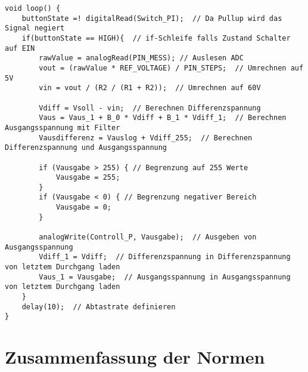 \begin{appendix}
\begin{lstlisting}[basicstyle=\tiny,style=myArduino]
void loop() {
	buttonState =! digitalRead(Switch_PI);  // Da Pullup wird das Signal negiert
	if(buttonState == HIGH){  // if-Schleife falls Zustand Schalter auf EIN
		rawValue = analogRead(PIN_MESS); // Auslesen ADC
		vout = (rawValue * REF_VOLTAGE) / PIN_STEPS;  // Umrechnen auf 5V
		vin = vout / (R2 / (R1 + R2));  // Umrechnen auf 60V
		
		Vdiff = Vsoll - vin;  // Berechnen Differenzspannung
		Vaus = Vaus_1 + B_0 * Vdiff + B_1 * Vdiff_1;  // Berechnen Ausgangsspannung mit Filter
		Vausdifferenz = Vauslog + Vdiff_255;  // Berechnen Differenzspannung und Ausgangsspannung
		
		if (Vausgabe > 255) { // Begrenzung auf 255 Werte
			Vausgabe = 255;
		}
		if (Vausgabe < 0) { // Begrenzung negativer Bereich
			Vausgabe = 0;
		}
		
		analogWrite(Controll_P, Vausgabe);  // Ausgeben von Ausgangsspannung
		Vdiff_1 = Vdiff;  // Differenzspannung in Differenzspannung von letztem Durchgang laden
		Vaus_1 = Vausgabe;  // Ausgangsspannung in Ausgangsspannung von letztem Durchgang laden
	}
	delay(10);  // Abtastrate definieren
}
\end{lstlisting}

\section{Zusammenfassung der Normen}


\end{appendix}
